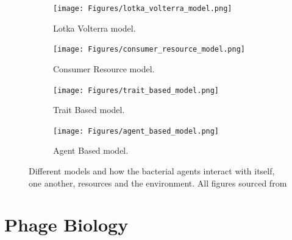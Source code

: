 \begin{figure}[h!]
    \centering
    \begin{subfigure}{0.49\linewidth}
        \centering
        \captionsetup{width=1\linewidth}
        \texttt{[image: Figures/lotka\_volterra\_model.png]}
        \caption{
            Lotka Volterra model.
        }
        \label{fig:lotka_volterra_model}
    \end{subfigure}
    \hfill
    \begin{subfigure}{0.49\linewidth}
        \centering
        \captionsetup{width=1\linewidth}
        \texttt{[image: Figures/consumer\_resource\_model.png]}
        \caption{
            Consumer Resource model.
        }
        \label{fig:consumer_resource_model}
    \end{subfigure}
    \hfill
    \begin{subfigure}{0.49\linewidth}
        \centering
        \captionsetup{width=1\linewidth}
        \texttt{[image: Figures/trait\_based\_model.png]}
        \caption{
            Trait Based model. 
        }
        \label{fig:trait_based_model}
    \end{subfigure}
    \hfill
    \begin{subfigure}{0.49\linewidth}
        \centering
        \captionsetup{width=1\linewidth}
        \texttt{[image: Figures/agent\_based\_model.png]}
        \caption{
            Agent Based model. 
        }
        \label{fig:agent_based_model}
    \end{subfigure}
    \caption{Different models and how the bacterial agents interact with itself, one another, resources and the environment. All figures sourced from \citet{vandenbergEcologicalModellingApproaches2022}}
\end{figure}


\section{Phage Biology}

